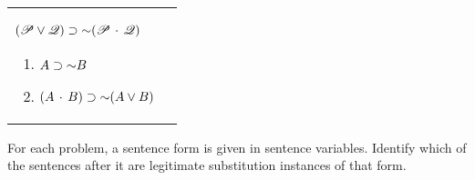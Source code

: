\begin{exercises}
\begin{longtabu}{X[1,p,m]X[1,p,m]}
\item	$(\mathscr{P} \vee \mathscr{Q}) \supset \mathord{\sim}(\mathscr{P} \,\cdot\, \mathscr{Q})$
\begin{flushleft} 	
\begin{enumerate}[label=\alph*.]
	\item	$A \supset \mathord{\sim} B$
	\item	$(A \,\cdot\, B) \supset \mathord{\sim}(A \vee B)$
	\end{enumerate}
\end{flushleft} 

\end{longtabu}
\end{exercises}
\noindent\problempart For each problem, a sentence form is given in sentence variables. Identify which of the sentences after it are legitimate substitution instances of that form. 

